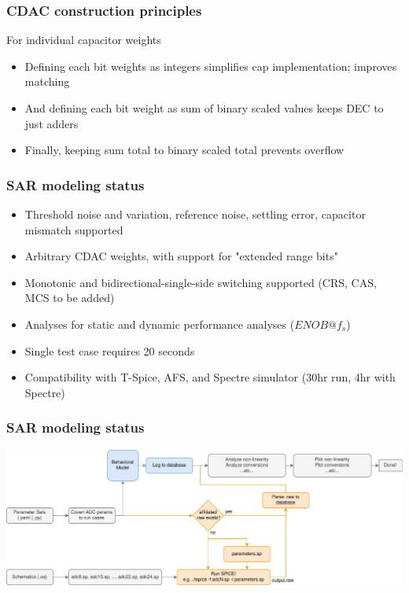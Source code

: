 \documentclass[aspectratio=169]{beamer}
\begin{document}
\begin{frame}
  \frametitle{CDAC construction principles}
  For individual capacitor weights
  \begin{itemize}
    \item Defining each bit weights as integers simplifies cap implementation; improves matching
    \item And defining each bit weight as sum of binary scaled values keeps DEC to just adders
    \item Finally, keeping sum total to binary scaled total prevents overflow
  \end{itemize}
  \end{frame}



\begin{frame}
  \frametitle{SAR modeling status}
  \begin{itemize}
    \item Threshold noise and variation, reference noise, settling error, capacitor mismatch supported
    \item Arbitrary CDAC weights, with support for "extended range bits"
    \item Monotonic and bidirectional-single-side switching supported (CRS, CAS, MCS to be added)
    \item Analyses for static and dynamic performance analyses ($ENOB @ f_{s}$)
    \item Single test case requires 20 seconds
    \item Compatibility with T-Spice, AFS, and Spectre simulator (30hr run, 4hr with Spectre)
  \end{itemize}

\end{frame}
\begin{frame}
    \frametitle{SAR modeling status}
  \includegraphics[width=\textwidth]{workflow.pdf}
\end{frame}

\end{document}
